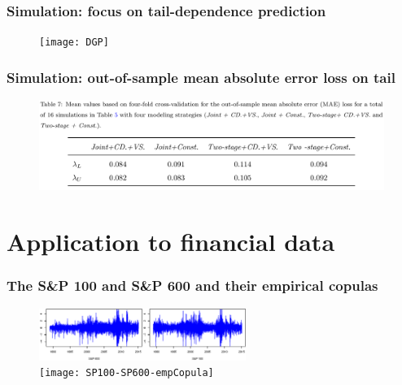 \documentclass[10pt,aspectratio=43]{beamer}
\begin{document}
\begin{frame}
  \frametitle{Simulation: focus on tail-dependence prediction}

  \begin{figure}[!h]
    \centering
    \texttt{[image: DGP]}
  \end{figure}
\end{frame}


\begin{frame}
  \frametitle{Simulation: out-of-sample mean absolute error loss on tail}

  \begin{figure}[!h]
    \centering
    \includegraphics[width=1\textwidth]{LOSS}
  \end{figure}
\end{frame}


\section{Application to financial data}

\begin{frame}
  \frametitle{The S\&P 100 and S\&P 600 and their empirical copulas}
 \begin{figure}[!h]
    \centering
    \includegraphics[width=0.6\textwidth]{SP100-SP600}\\
    \texttt{[image: SP100-SP600-empCopula]}
  \end{figure}
\end{frame}
\end{document}
